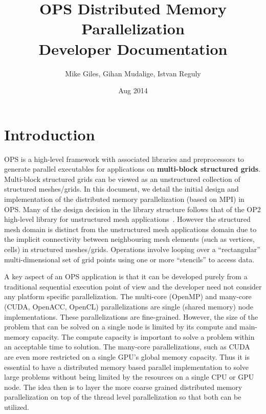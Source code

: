 \documentclass[11pt]{article}
\date{Aug 2014}
\begin{document}
\title{OPS Distributed Memory Parallelization \\Developer Documentation}
\author{Mike Giles, Gihan Mudalige, Istvan Reguly}
\maketitle

\newpage


\tableofcontents


\newpage
\section{Introduction}


OPS is a high-level framework with associated libraries and preprocessors to generate parallel executables for
applications on \textbf{multi-block structured grids}. Multi-block structured grids can be viewed as an unstructured
collection of structured meshes/grids. In this document, we detail the initial design and implementation of the
distributed memory parallelization (based on MPI) in OPS. Many of the design decision in the library structure follows
that of the OP2 high-level library for unstructured mesh applications~\cite{op2}. However the structured mesh domain is
distinct from the unstructured mesh applications domain due to the implicit connectivity between neighbouring mesh
elements (such as vertices, cells) in structured meshes/grids. Operations involve looping over a ``rectangular''
multi-dimensional set of grid points using one or more ``stencils'' to access data.

A key aspect of an OPS application is that it can be developed purely from a traditional sequential execution point of
view and the developer need not consider any platform specific parallelization. The multi-core (OpenMP) and
many-core (CUDA, OpenACC, OpenCL) parallelizations are single (shared memory) node implementations. These
parallelizations are fine-grained. However, the size of the problem that can be solved on a single node is limited by
its compute and main-memory capacity. The compute capacity is important to solve a problem within an acceptable time to
solution. The many-core parallelizations, such as CUDA are even more restricted on a single GPU's global memory
capacity. Thus it is essential to have a distributed memory based parallel implementation to solve large problems
without being limited by the resources on a single CPU or GPU node. The idea then is to layer the more coarse grained
distributed memory parallelization on top of the thread level parallelization so that both can be utilized.
\end{document}
